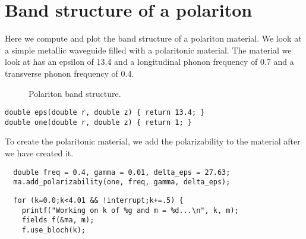 \section{Band structure of a polariton}

\begin{comment}
#include <stdio.h>
#include <stdlib.h>

#include "dactyl.h"

const double rmax = 1.0;
\end{comment}

Here we compute and plot the band structure of a polariton material.  We
look at a simple metallic waveguide filled with a polaritonic material.
The material we look at has an epsilon of 13.4 and a longitudinal phonon
frequency of 0.7 and a transverse phonon frequency of 0.4.

\begin{figure}
\label{polaritonbands}
\caption{Polariton band structure.}
\end{figure}

\begin{verbatim}
double eps(double r, double z) { return 13.4; }
double one(double r, double z) { return 1; }
\end{verbatim}

\begin{comment}
int main(int argc, char **argv) {
  deal_with_ctrl_c();
  const int a = 10;
  const int m = 0;
  double k;
  const double ttot = 1000;  
\end{comment}

\begin{comment}
  mat ma(eps, rmax, 0.0, a);
  const char *dirname = make_output_directory(argv[0]);
  printf("Storing output in directory %
  //FILE *ban = create_output_file(dirname, "bands");
  ma.set_output_directory(dirname);
  grace g("bands", dirname);
  g.set_range(0.0, 4.0, 0.0, 1.1);
\end{comment}

To create the polaritonic material, we add the polarizability to the
material after we have created it.

\begin{verbatim}
  double freq = 0.4, gamma = 0.01, delta_eps = 27.63;
  ma.add_polarizability(one, freq, gamma, delta_eps);
\end{verbatim}

\begin{verbatim}
  for (k=0.0;k<4.01 && !interrupt;k+=.5) {
    printf("Working on k of %g and m = %d...\n", k, m);
    fields f(&ma, m);
    f.use_bloch(k);
\end{verbatim}

